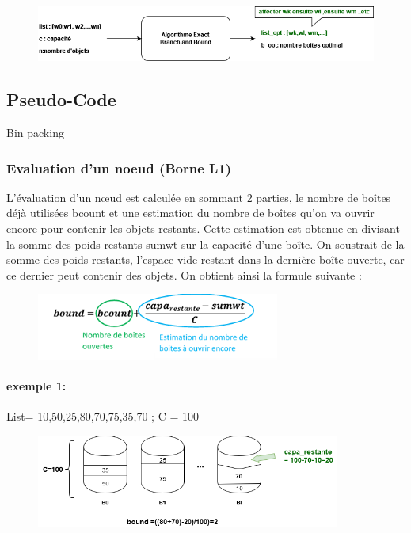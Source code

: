 \documentclass[12pt]{article}
\begin{document}
\begin{figure}[h]
    \includegraphics[width=\linewidth]{../figures/diagr1.png}
\end{figure}
\subsection{Pseudo-Code}
\begin{algorithm}
    \caption{Bin packing}
    
    \end{algorithm}
\subsubsection*{Evaluation d'un noeud (Borne L1)}
L’évaluation d’un nœud est calculée en sommant 2 parties, le nombre de boîtes déjà utilisées bcount et une estimation du nombre de boîtes qu’on va ouvrir encore pour contenir les objets restants. Cette estimation est obtenue en divisant la somme des poids restants sumwt sur la capacité d’une boîte. On soustrait de la somme des poids restants, l’espace vide 
restant dans la dernière boîte ouverte, car ce dernier peut contenir des objets. On obtient ainsi la formule suivante :  

\begin{figure}[h!]
    \includegraphics[width=8cm]{../figures/formule1.png}
\end{figure}
\paragraph{exemple 1: }
List= {10,50,25,80,70,75,35,70} ;   C = 100 
\begin{figure}[h!]
    \includegraphics[width=10cm]{../figures/example1.png}
\end{figure}
\end{document}
